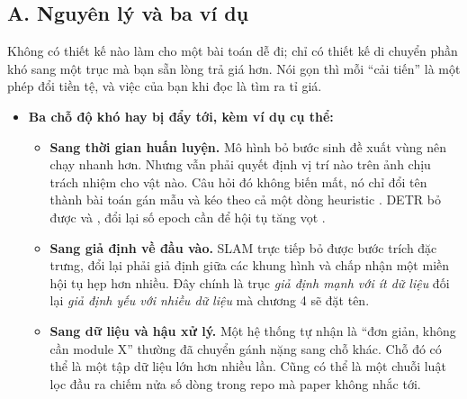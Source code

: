 \documentclass[../../deep_learning.tex]{subfiles}
\begin{document}
\subsection{A. Nguyên lý và ba ví dụ}
Không có thiết kế nào làm cho một bài toán dễ đi; chỉ có thiết kế di chuyển phần khó sang một trục mà bạn sẵn lòng trả giá hơn. Nói gọn thì mỗi ``cải tiến'' là một phép đổi tiền tệ, và việc của bạn khi đọc là tìm ra tỉ giá.

\begin{itemize}
\item \textbf{Ba chỗ độ khó hay bị đẩy tới, kèm ví dụ cụ thể:}
  \begin{itemize}
  \item \textbf{Sang thời gian huấn luyện.} Mô hình  bỏ bước sinh đề xuất vùng nên chạy nhanh hơn. Nhưng vẫn phải quyết định vị trí nào trên ảnh chịu trách nhiệm cho vật nào. Câu hỏi đó không biến mất, nó chỉ đổi tên thành bài toán gán mẫu và kéo theo cả một dòng heuristic \cite{tian2019fcos,zhang2020atss}. DETR bỏ được  và , đổi lại số epoch cần để hội tụ tăng vọt \cite{carion2020detr}.
  \item \textbf{Sang giả định về đầu vào.} SLAM trực tiếp bỏ được bước trích đặc trưng, đổi lại phải giả định  giữa các khung hình và chấp nhận một miền hội tụ hẹp hơn nhiều. Đây chính là trục \emph{giả định mạnh với ít dữ liệu} đối lại \emph{giả định yếu với nhiều dữ liệu} mà chương 4 sẽ đặt tên. 
  \item \textbf{Sang dữ liệu và hậu xử lý.} Một hệ thống tự nhận là ``đơn giản, không cần module X'' thường đã chuyển gánh nặng sang chỗ khác. Chỗ đó có thể là một tập dữ liệu lớn hơn nhiều lần. Cũng có thể là một chuỗi luật lọc đầu ra chiếm nửa số dòng trong repo mà paper không nhắc tới.
  \end{itemize}
\end{itemize}
\end{document}

